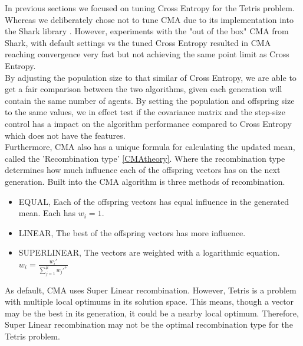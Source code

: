 In previous sections we focused on tuning Cross Entropy for the Tetris 
problem. Whereas we deliberately chose not to tune CMA due to its implementation 
into the Shark library \citep{shark08}. However, experiments with the "out of 
the box" CMA from Shark, with default settings vs the tuned Cross Entropy
resulted in CMA reaching convergence very fast but not achieving the same point
limit as Cross Entropy.\\
By adjusting the population size to that similar of Cross Entropy, we are able
to get a fair comparison between the two algorithms, given each generation will
contain the same number of agents. By setting the population and offspring size
to the same values, we in effect test if the covariance matrix and the step-size
control has a impact on the algorithm performance compared to Cross Entropy
which does not have the features.\\
Furthermore, CMA also has a unique formula for calculating the updated mean,
called the 'Recombination type' \ref{CMAtheory}. Where the recombination type
determines how much influence each of the offspring vectors has on the next
generation. Built into the CMA algorithm is three methods of recombination. 
\begin{itemize}
\item EQUAL, Each of the offspring vectors has equal influence in the generated mean. Each has $w_i = 1$.
\item LINEAR, The best of the offspring vectors has more influence. 
\item SUPERLINEAR, The vectors are weighted with a logarithmic equation. $w_i = \frac{w_i'}{\sum_{j=1}^{\mu} w_j'^+}$
\end{itemize}
As default, CMA uses Super Linear recombination. However, Tetris is a problem
with multiple local optimums in its solution space. This means, though a vector may be the best in its generation, it could be a nearby local optimum. Therefore, Super Linear recombination may not be the optimal recombination type for the Tetris problem.\\
\\
\\
\\
\\
\\

